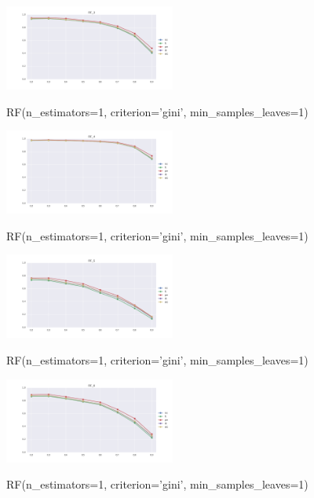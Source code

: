 \documentclass{sig-alternate-05-2015}
\begin{document}
\begin{figure}[]
  \centering
  \caption{RF(n\_estimators=1, criterion='gini', min\_samples\_leaves=1)}
  \includegraphics[width=0.5\textwidth]{../plots/RF_3}
  \label{fig:anomalySetup}
\end{figure}

\begin{figure}[]
  \centering
  \caption{RF(n\_estimators=1, criterion='gini', min\_samples\_leaves=1)}
  \includegraphics[width=0.5\textwidth]{../plots/RF_4}
  \label{fig:anomalySetup}
\end{figure}

\begin{figure}[]
  \centering
  \caption{RF(n\_estimators=1, criterion='gini', min\_samples\_leaves=1)}
  \includegraphics[width=0.5\textwidth]{../plots/RF_5}
  \label{fig:anomalySetup}
\end{figure}

\begin{figure}[]
  \centering
  \caption{RF(n\_estimators=1, criterion='gini', min\_samples\_leaves=1)}
  \includegraphics[width=0.5\textwidth]{../plots/RF_6}
  \label{fig:anomalySetup}
\end{figure}
\end{document}
